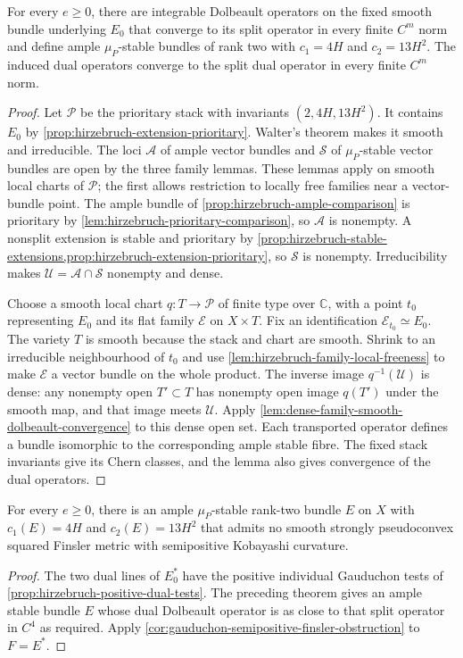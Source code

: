 \begin{theorem}\label{thm:hirzebruch-stable-ample-approximation}
For every $e\geq0$, there are integrable Dolbeault operators on the fixed
smooth bundle underlying $E_0$ that converge to its split operator in
every finite $C^m$ norm and define ample $\mu_P$-stable bundles of rank
two with $c_1=4H$ and $c_2=13H^2$. The induced dual operators converge
to the split dual operator in every finite $C^m$ norm.
\end{theorem}
\begin{proof}
Let $\mathcal P$ be the prioritary stack with invariants
$(2,4H,13H^2)$. It contains $E_0$ by
\cref{prop:hirzebruch-extension-prioritary}. Walter's theorem makes it
smooth and irreducible.
The loci $\mathcal A$ of ample vector bundles and $\mathcal S$ of
$\mu_P$-stable vector bundles are open by the three family lemmas.
These lemmas apply on smooth local charts of $\mathcal P$; the first
allows restriction to locally free families near a vector-bundle point.
The ample bundle of \cref{prop:hirzebruch-ample-comparison} is prioritary
by \cref{lem:hirzebruch-prioritary-comparison}, so $\mathcal A$ is nonempty.
A nonsplit extension is stable and prioritary by
\cref{prop:hirzebruch-stable-extensions,prop:hirzebruch-extension-prioritary},
so $\mathcal S$ is nonempty. Irreducibility makes
$\mathcal U=\mathcal A\cap\mathcal S$ nonempty and dense.

Choose a smooth local chart
$q:T\to\mathcal P$ of finite type over $\mathbb C$, with a point $t_0$
representing $E_0$ and its flat family $\mathcal E$ on $X\times T$.
Fix an identification $\mathcal E_{t_0}\simeq E_0$.
The variety $T$ is smooth because the stack and chart are smooth.
Shrink to an irreducible neighbourhood of $t_0$ and use
\cref{lem:hirzebruch-family-local-freeness} to make $\mathcal E$ a vector
bundle on the whole product. The inverse image $q^{-1}(\mathcal U)$ is
dense: any nonempty open $T'\subset T$ has nonempty open image $q(T')$
under the smooth map, and that image meets $\mathcal U$.
Apply \cref{lem:dense-family-smooth-dolbeault-convergence} to this dense
open set. Each transported operator defines a bundle isomorphic to the
corresponding ample stable fibre. The fixed stack invariants give its
Chern classes, and the lemma also gives convergence of the dual operators.
\end{proof}

\begin{corollary}\label{cor:hirzebruch-stable-ample-finsler-obstruction}
For every $e\geq0$, there is an ample $\mu_P$-stable rank-two bundle $E$
on $X$ with $c_1(E)=4H$ and $c_2(E)=13H^2$ that admits no smooth strongly
pseudoconvex squared Finsler metric with semipositive Kobayashi curvature.
\end{corollary}
\begin{proof}
The two dual lines of $E_0^*$ have the positive individual Gauduchon
tests of \cref{prop:hirzebruch-positive-dual-tests}. The preceding theorem
gives an ample stable bundle $E$ whose dual Dolbeault operator is as
close to that split operator in $C^4$ as required. Apply
\cref{cor:gauduchon-semipositive-finsler-obstruction} to $F=E^*$.
\end{proof}

